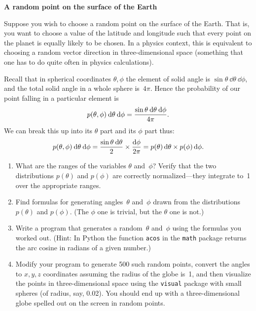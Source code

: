\documentclass[12pt]{article}
\begin{document}
\begin{exercises}

\exercise \textbf{A random point on the surface of the Earth}

\exskip Suppose you wish to choose a random point on the surface of the
Earth.  That is, you want to choose a value of the latitude and longitude
such that every point on the planet is equally likely to be chosen.  In a
physics context, this is equivalent to choosing a random vector direction
in three-dimensional space (something that one has to do quite often in
physics calculations).

  Recall that in spherical coordinates $\theta,\phi$ the element of solid
  angle is $\sin \theta \>\dd\theta\>\dd\phi$, and the total solid angle in
  a whole sphere is~$4\pi$.  Hence the probability of our point falling in
  a particular element is
\begin{displaymath}
p(\theta,\phi)\>\mathrm{d}\theta\>\mathrm{d}\phi
  = {\sin \theta \>\mathrm{d}\theta\>\mathrm{d}\phi\over4\pi}.
\end{displaymath}
We can break this up into its $\theta$ part and its $\phi$ part thus:
\begin{displaymath}
p(\theta,\phi)\>\mathrm{d}\theta\>\mathrm{d}\phi
               = {\sin \theta \>\mathrm{d}\theta\over2} \times{\mathrm{d}\phi\over2\pi}
               = p(\theta)\,\mathrm{d}\theta\times p(\phi)\,\mathrm{d}\phi.
\end{displaymath}

\begin{enumerate}\setlength{\itemsep}{0pt}
\item What are the ranges of the variables $\theta$ and~$\phi$?  Verify
  that the two distributions $p(\theta)$ and $p(\phi)$ are correctly
  normalized---they integrate to~1 over the appropriate ranges.
\item Find formulas for generating angles~$\theta$ and~$\phi$ drawn from
  the distributions $p(\theta)$ and $p(\phi)$.  (The $\phi$ one is trivial,
  but the $\theta$ one is not.)
\item Write a program that generates a random~$\theta$ and~$\phi$ using the
  formulas you worked out.  (Hint: In Python the function
  \verb|acos| in the \verb|math| package returns the arc cosine in
  radians of a given number.)
\item Modify your program to generate 500 such random points, convert the
  angles to $x,y,z$ coordinates assuming the radius of the globe is~1, and
  then visualize the points in three-dimensional space using the
  \verb|visual| package with small spheres (of radius, say, 0.02).  You
  should end up with a three-dimensional globe spelled out on the screen in
  random points.
\end{enumerate}



\end{exercises}
\end{document}
